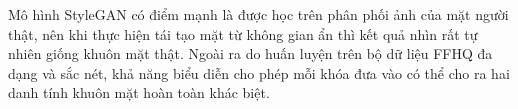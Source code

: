 Mô hình StyleGAN có điểm mạnh là được học trên phân phối ảnh của mặt người thật, nên khi thực hiện tái tạo mặt từ không gian ẩn thì kết quả nhìn rất tự nhiên giống khuôn mặt thật. Ngoài ra do huấn luyện trên bộ dữ liệu FFHQ đa dạng và sắc nét, khả năng biểu diễn cho phép mỗi khóa đưa vào có thể cho ra hai danh tính khuôn mặt hoàn toàn khác biệt.